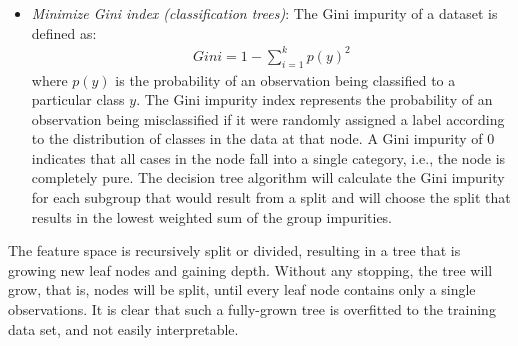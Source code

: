 \begin{advanced}
\begin{enumerate}
\begin{itemize}
       Intuitively, the entropy $H$ expresses the uncertainty in the distribution of $Y$. Knowing or assuming a value (or range of values) for some feature $j$ should decrease the uncertainty, that is, lead to a gain in information. The decision tree algorithm will calculate the information gain resulting from each split and will choose the split with the highest gain.
   \item \emph{Minimize Gini index (classification trees)}:
   The Gini impurity of a dataset is defined as:
\begin{align*}
Gini = 1 - \sum_{i=1}^k p(y)^2
\end{align*}
where $p(y)$ is the probability of an observation being classified to a particular class $y$. The Gini impurity index represents the probability of an observation being misclassified if it were randomly assigned a label according to the distribution of classes in the data at that node. A Gini impurity of 0 indicates that all cases in the node fall into a single category, i.e., the node is completely pure. The decision tree algorithm will calculate the Gini impurity for each subgroup that would result from a split and will choose the split that results in the lowest weighted sum of the group impurities.
\end{itemize}
\end{enumerate}
\end{advanced}

The feature space is recursively split or divided, resulting in a tree that is growing new leaf nodes and gaining depth. Without any stopping, the tree will grow, that is, nodes will be split, until every leaf node contains only a single observations. It is clear that such a fully-grown tree is overfitted to the training data set, and not easily interpretable. 


